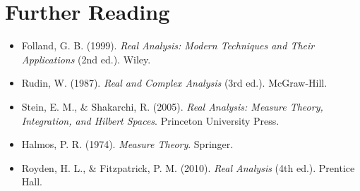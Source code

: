 \documentclass[12pt,a4paper]{article}
\theoremstyle{plain}
\theoremstyle{definition}
\begin{document}
\section{Further Reading}

\begin{itemize}
\item Folland, G. B. (1999). \textit{Real Analysis: Modern Techniques and Their Applications} (2nd ed.). Wiley.
\item Rudin, W. (1987). \textit{Real and Complex Analysis} (3rd ed.). McGraw-Hill.
\item Stein, E. M., \& Shakarchi, R. (2005). \textit{Real Analysis: Measure Theory, Integration, and Hilbert Spaces}. Princeton University Press.
\item Halmos, P. R. (1974). \textit{Measure Theory}. Springer.
\item Royden, H. L., \& Fitzpatrick, P. M. (2010). \textit{Real Analysis} (4th ed.). Prentice Hall.
\end{itemize}
\end{document}
